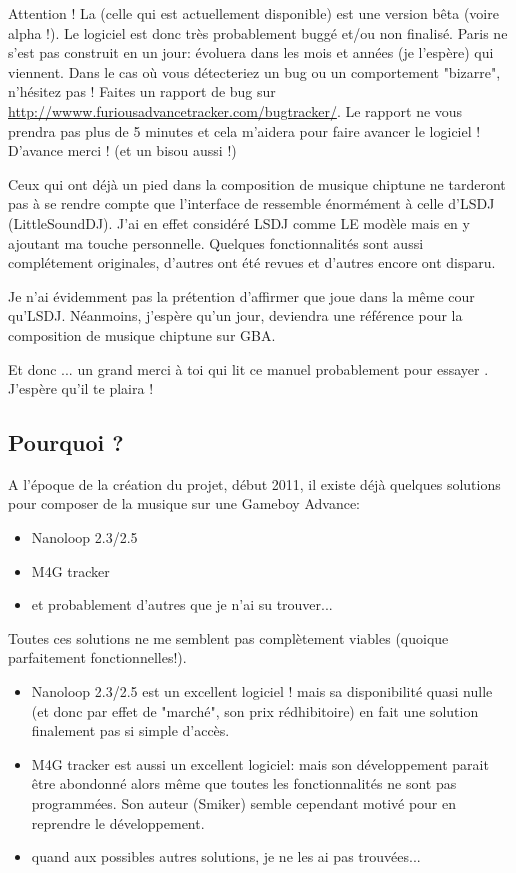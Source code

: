 \documentclass[12pt,a4paper]{article}
\begin{document}
    Attention ! La \fatversion (celle qui est actuellement disponible) est une version bêta (voire alpha !). Le logiciel est donc très probablement buggé et/ou non finalisé. Paris ne s'est pas construit en un jour: \FAT évoluera dans les mois et années (je l'espère) qui viennent. Dans le cas où vous détecteriez un bug ou un comportement "bizarre", n'hésitez pas ! Faites un rapport de bug sur \url{http://wwww.furiousadvancetracker.com/bugtracker/}. Le rapport ne vous prendra pas plus de 5 minutes et cela m'aidera pour faire avancer le logiciel ! D'avance merci ! (et un bisou aussi !)\medskip
    
    Ceux qui ont déjà un pied dans la composition de musique chiptune ne tarderont pas à se rendre compte que l'interface de \FAT ressemble énormément à celle d'LSDJ (LittleSoundDJ). J'ai en effet considéré LSDJ comme LE modèle mais en y ajoutant ma touche personnelle. Quelques fonctionnalités sont aussi complétement originales, d'autres ont été revues et d'autres encore ont disparu.\medskip
    
    Je n'ai évidemment pas la prétention d'affirmer que \FAT joue dans la même cour qu'LSDJ. Néanmoins, j'espère qu'un jour, \FAT deviendra une référence pour la composition de musique chiptune sur GBA.\medskip
    
    Et donc ... un grand merci à toi qui lit ce manuel probablement pour essayer \FAT. J'espère qu'il te plaira !
  
    \subsection{Pourquoi \FAT ?}
    A l'époque de la création du projet, début 2011, il existe déjà quelques solutions pour composer de la musique sur une Gameboy Advance:\medskip
    
    \begin{itemize}
        \item{Nanoloop 2.3/2.5}
        \item{M4G tracker}
        \item{et probablement d'autres que je n'ai su trouver...}
    \end{itemize}\medskip
    
    Toutes ces solutions ne me semblent pas complètement viables (quoique parfaitement fonctionnelles!).\medskip
    
    \begin{itemize}
        \item{Nanoloop 2.3/2.5 est un excellent logiciel ! mais sa disponibilité quasi nulle (et donc par effet de "marché", son prix rédhibitoire) en fait une solution finalement pas si simple d'accès.}
        \item{M4G tracker est aussi un excellent logiciel: mais son développement parait être abondonné alors même que toutes les fonctionnalités ne sont pas programmées. Son auteur (Smiker) semble cependant motivé pour en reprendre le développement.}
        \item{quand aux possibles autres solutions, je ne les ai pas trouvées...}
    \end{itemize}\medskip
    
\end{document}
